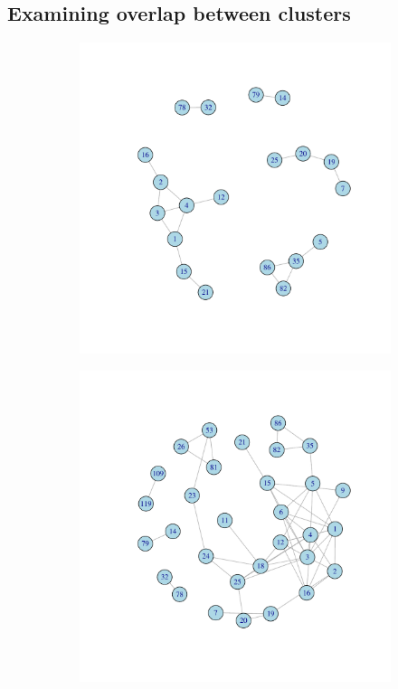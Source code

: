 \documentclass[12pt, oneside]{article}   	%
\begin{document}
	\subsection{Examining overlap between clusters}
	
	\begin{figure}[H]
		\centering
		\begin{subfigure}[t]{0.48\textwidth}
			\centering
			\includegraphics[width=\linewidth]{ikc10_m_pw.pdf} 
		\end{subfigure}
		\hfill
		\begin{subfigure}[t]{0.48\textwidth}
			\centering
			\includegraphics[width=\linewidth]{ikc10_k_pw.pdf} 

\end{subfigure}
\end{figure}
\end{document}
